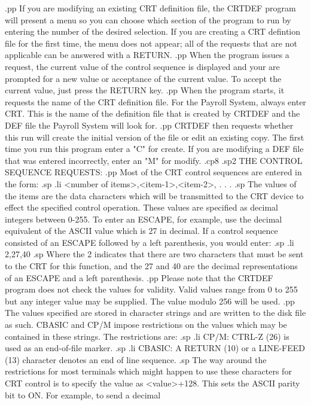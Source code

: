 .pp
If you are modifying an existing CRT definition file, the CRTDEF program
will present a menu so you can choose which section of the program to run by
entering the number of the desired selection.  If you are creating a CRT
defintion file for the first time, the menu does not appear; all of the
requests that are not applicable can be answered with a RETURN.
.pp
When the program issues a request, the current value of the control sequence
is displayed and your are prompted for a new value or acceptance
of the current value.	To accept the current value, just press the RETURN
key.
.pp
When the program starts, it requests the name of the CRT definition
file.  For the Payroll System, always
enter CRT.  This is the name of the definition file that is created by
CRTDEF and the DEF file the Payroll System will look for.
.pp
CRTDEF then requests whether this run will create the initial version
of the file or edit an existing copy.  The first time you run this
program enter a "C" for create.  If you are modifying a DEF file that was
entered incorrectly, enter an "M" for modify.
.cp8
.sp2
THE CONTROL SEQUENCE REQUESTS:
.pp
Most of the CRT control sequences are entered in the form:
.sp
.li
	<number of items>,<item-1>,<item-2>, . . .
.sp
The values of the items are the data characters which will be transmitted
to the CRT device to effect the specified control operation.  These
values are specified as decimal integers between 0-255.  To enter an
ESCAPE, for example, use the decimal equivalent of the ASCII value which
is 27 in decimal.  If a control sequence consisted of an ESCAPE followed by
a left parenthesis, you would enter:
.sp
.li
	2,27,40
.sp
Where the 2 indicates that there are two characters that must be sent to the
CRT for this function, and the 27 and 40 are the decimal representations
of an ESCAPE and a left parenthesis.
.pp
Please note that the CRTDEF program does not check the values for validity.
Valid values range from 0 to 255 but any integer value may be supplied.  The
value modulo 256 will be used.
.pp
The values specified are stored in character strings and are written
to the disk file as such.  CBASIC and CP/M impose restrictions on the
values which may be contained in these strings.  The restrictions are:
.sp
.li
	CP/M:  CTRL-Z (26) is used as an end-of-file marker.
.sp
.li
	CBASIC:  A RETURN (10) or a LINE-FEED (13) character
		 denotes an end of line sequence.
.sp
The way around the restrictions for most terminals which might happen to use
these characters for CRT control is to specify the value as <value>+128.
This sets the ASCII parity bit to ON.  For example, to send a decimal
